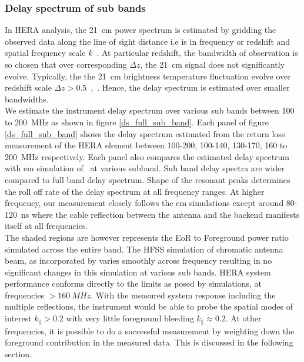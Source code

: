 \documentclass[twocolumn]{emulateapj}
\begin{document}
    \subsubsection{Delay spectrum of sub bands}
    In HERA analysis, the 21~cm power spectrum
    is estimated by gridding the observed data along the line of sight distance i.e
    is in frequency or redshift and spatial frequency scale
    $k$~\citep{liu_et_al2014a}. At particular redshift, the bandwidth of
    observation is so chosen that over corresponding $\Delta z$, the 21~cm
    signal does not significantly evolve. Typically, the the 21~cm brightness
    temperature fluctuation evolve over redshift scale $\Delta
    z>0.5$~\citep{loeb_zaldarriaga2004},~\citep{lidz_et_al2008}. Hence, the delay
    spectrum is estimated over smaller bandwidths.\\ We estimate the instrument
    delay spectrum over various sub bands between 100 to 200~MHz as shown in figure
    \ref{ds_full_sub_band}. Each panel of figure \ref{ds_full_sub_band} shows the
    delay spectrum estimated from the return loss measurement of the HERA element
    between 100-200, 100-140, 130-170, 160 to 200~MHz respectively. Each panel also
    compares the estimated delay spectrum with em simulation of~\cite{deBoer_2016} at various subband.  Sub band delay spectra are wider compared to full
    band delay spectrum.  Shape of the resonant peaks determines the roll off rate
    of the delay spectrum at all frequency ranges. At higher
    frequency, our measurement closely follows the em simulations except around
    80-120~ns where the cable reflection between the antenna and the backend manifests
    itself at all frequencies. \\ 
    The shaded regions are however represents the EoR to Foreground power ratio simulated across the entire band.
    The HFSS simulation of chromatic antenna beam, as incorporated by \cite{Thyagarajan_et_al2016} varies smoothly  	across frequency resulting in no significant changes in this simulation at various sub bands.  
     HERA system performance conforms directly to the limits as posed by simulations, at frequencies $>160~MHz$. With the measured system response including the multiple reflections, the instrument would be able to probe the spatial modes of interest $k_{\parallel}>0.2$ with very little foreground bleeding $k_{\parallel} \approx 0.2$.
      At other frequencies, it is possible to do a successful measurement by weighting down the
      foreground contribution in the measured data. This is discussed in the following section.
\end{document}
